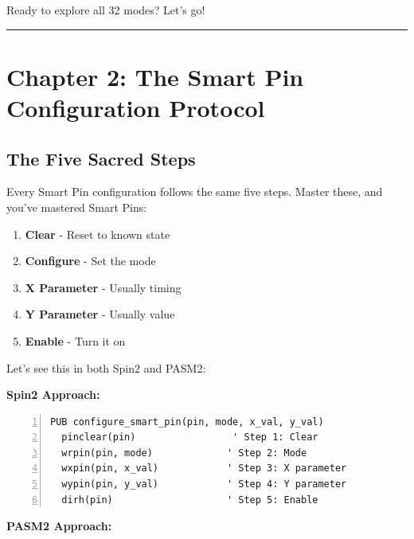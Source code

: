 \documentclass[11pt,a4paper,oneside,english]{book}
\begin{document}
Ready to explore all 32 modes? Let's go!

\begin{center}\rule{0.5\linewidth}{0.5pt}\end{center}

\clearpage

\clearpage

\hypertarget{chapter-2-the-smart-pin-configuration-protocol}{%
\chapter{Chapter 2: The Smart Pin Configuration
Protocol}\label{chapter-2-the-smart-pin-configuration-protocol}}

\hypertarget{the-five-sacred-steps}{%
\section{The Five Sacred Steps}\label{the-five-sacred-steps}}

Every Smart Pin configuration follows the same five steps. Master these,
and you've mastered Smart Pins:

\begin{enumerate}
\def\labelenumi{\arabic{enumi}.}
\tightlist
\item
  \textbf{Clear} - Reset to known state
\item
  \textbf{Configure} - Set the mode
\item
  \textbf{X Parameter} - Usually timing
\item
  \textbf{Y Parameter} - Usually value
\item
  \textbf{Enable} - Turn it on
\end{enumerate}

Let's see this in both Spin2 and PASM2:

\textbf{Spin2 Approach:}

\begin{Spin2Block}
\begin{Verbatim}[numbers=left,numbersep=5pt,xleftmargin=15pt]
PUB configure_smart_pin(pin, mode, x_val, y_val)
  pinclear(pin)                 ' Step 1: Clear
  wrpin(pin, mode)             ' Step 2: Mode
  wxpin(pin, x_val)            ' Step 3: X parameter
  wypin(pin, y_val)            ' Step 4: Y parameter
  dirh(pin)                    ' Step 5: Enable
\end{Verbatim}
\end{Spin2Block}

\textbf{PASM2 Approach:}
\end{document}

